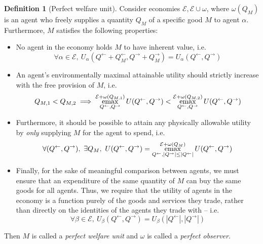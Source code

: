 \documentclass{journal}
\theoremstyle{plain}
\theoremstyle{definition}
\newtheorem{dfn}{Definition}
\newcommand{\economy}{\ensuremath{\mathcal{E}}}
\newcommand{\emax}{\ensuremath{\operatornamewithlimits{emax}}}
\begin{document}
\begin{dfn}[Perfect welfare unit]
    \label{dfn:pfu}
    Consider economies $\economy, \economy\cup\omega$, where $\omega(Q_M)$ is an agent who freely supplies a quantity $Q_M$ of a specific good $M$ to agent $\alpha$. Furthermore, $M$ satisfies the following properties:
    \begin{itemize}
        \item No agent in the economy holds $M$ to have inherent value, i.e. 
        \begin{equation}
            \label{eq:pwu1}
            \forall \alpha\in\economy,\  U_\alpha(Q^\leftarrow + Q_M^\leftarrow,Q^\rightarrow + Q_M^\rightarrow)=U_\alpha(Q^\leftarrow,Q^\rightarrow)
        \end{equation}
        \item An agent's environmentally maximal attainable utility should strictly increase with the free provision of $M$, i.e. 
        \begin{equation}
            \label{eq:pwu2}
            Q_{M, 1} < Q_{M, 2} \implies \emax\limits_{Q^\leftarrow, Q^\rightarrow}^{\economy + \omega(Q_{M, 1})} U(Q^\leftarrow, Q^\rightarrow) < \emax\limits_{Q^\leftarrow, Q^\rightarrow}^{\economy+\omega(Q_{M, 2})} U(Q^\leftarrow, Q^\rightarrow)
        \end{equation}
        \item Furthermore, it should be possible to attain any physically allowable utility by \emph{only} supplying $M$ for the agent to spend, i.e.
        \begin{equation}
            \label{eq:pwu3}
            \forall (Q^\leftarrow, Q^\rightarrow), \ \exists Q_M,\  U(Q^\leftarrow, Q^\rightarrow) = \emax\limits_{Q^\leftarrow, |Q^\rightarrow|\le |Q^{\leftarrow}|}^{\economy + \omega(Q_M)} U(Q^\leftarrow, Q^\rightarrow)
        \end{equation}
        \item Finally, for the sake of meaningful comparison between agents, we must ensure that an expenditure of the same quantity of $M$ can buy the same goods for all agents. Thus, we require that the utility of agents in the economy is a function purely of the goods and services they trade, rather than directly on the identities of the agents they trade with -- i.e.
        \begin{equation}
            \label{eq:pwu4} 
            \forall \beta\in\economy,\  U_\beta(Q^\leftarrow, Q^\rightarrow) = U_\beta(|Q^\leftarrow|, |Q^\rightarrow|)
        \end{equation}
    \end{itemize}
    Then $M$ is called a \emph{perfect welfare unit} and $\omega$ is called a \emph{perfect observer}.
\end{dfn}
\end{document}

